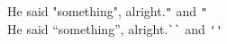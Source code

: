 \documentclass[crop]{standalone}
\begin{document}
\noindent
He said "something", alright.\hfill\verb|"| and \verb|"|\\[12pt]
\noindent
He said ``something'', alright.\hfill\verb|``| and \verb|''|
\end{document}

